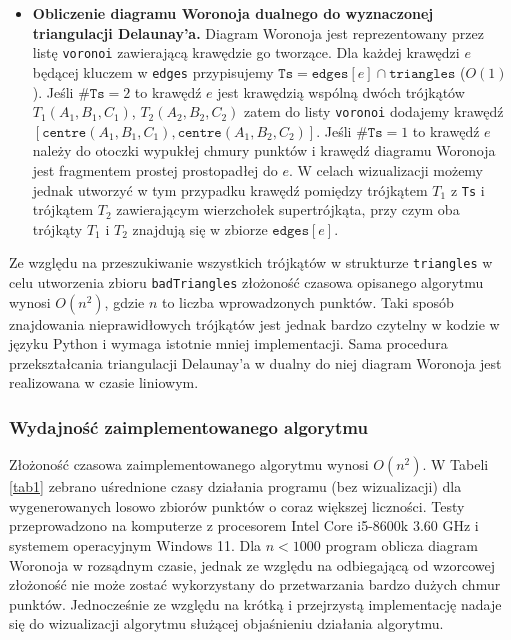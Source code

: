 \documentclass{myclass}
\begin{document}
\begin{itemize}
    \item \textbf{Obliczenie diagramu Woronoja dualnego do wyznaczonej
    triangulacji Delaunay'a.} Diagram Woronoja jest reprezentowany przez listę
    \texttt{voronoi} zawierającą krawędzie go tworzące. Dla każdej krawędzi
    \(e\) będącej kluczem w \texttt{edges} przypisujemy \(\texttt{Ts} =
    \texttt{edges}[e] \cap \texttt{triangles}\) (\(O(1)\)). Jeśli
    \(\#\texttt{Ts} = 2\) to krawędź \(e\) jest krawędzią wspólną dwóch
    trójkątów \(T_1(A_1,B_1,C_1)\), \(T_2(A_2,B_2,C_2)\) zatem do listy
    \texttt{voronoi} dodajemy krawędź \([\texttt{centre}(A_1,B_1,C_1),
    \texttt{centre}(A_1,B_2,C_2)]\). Jeśli \(\#\texttt{Ts} = 1\) to krawędź
    \(e\) należy do otoczki wypukłej chmury punktów i krawędź diagramu Woronoja
    jest fragmentem prostej prostopadłej do \(e\). W celach wizualizacji możemy
    jednak utworzyć w tym przypadku krawędź pomiędzy trójkątem \(T_1\) z
    \texttt{Ts} i trójkątem \(T_2\) zawierającym wierzchołek supertrójkąta, przy
    czym oba trójkąty \(T_1\) i \(T_2\) znajdują się w zbiorze
    \(\texttt{edges}[e]\).

\end{itemize}

Ze względu na przeszukiwanie wszystkich trójkątów w strukturze
\texttt{triangles} w celu utworzenia zbioru \texttt{badTriangles} złożoność
czasowa opisanego algorytmu wynosi \(O(n^2)\), gdzie \(n\) to liczba
wprowadzonych punktów. Taki sposób znajdowania nieprawidłowych trójkątów jest
jednak bardzo czytelny w kodzie w języku Python i wymaga istotnie mniej
implementacji. Sama procedura przekształcania triangulacji Delaunay'a w dualny
do niej diagram Woronoja jest realizowana w czasie liniowym.

\subsubsection{Wydajność zaimplementowanego algorytmu}

Złożoność czasowa zaimplementowanego algorytmu wynosi \(O(n^2)\). W Tabeli
\ref{tab1} zebrano uśrednione czasy działania programu (bez wizualizacji) dla
wygenerowanych losowo zbiorów punktów o coraz większej liczności. Testy
przeprowadzono na komputerze z procesorem Intel Core i5-8600k 3.60 GHz i
systemem operacyjnym Windows 11. Dla \(n<1000\) program oblicza diagram Woronoja
w rozsądnym czasie, jednak ze względu na odbiegającą od wzorcowej złożoność nie
może zostać wykorzystany do przetwarzania bardzo dużych chmur punktów.
Jednocześnie ze względu na krótką i przejrzystą implementację nadaje się do
wizualizacji algorytmu służącej objaśnieniu działania algorytmu.
\end{document}
